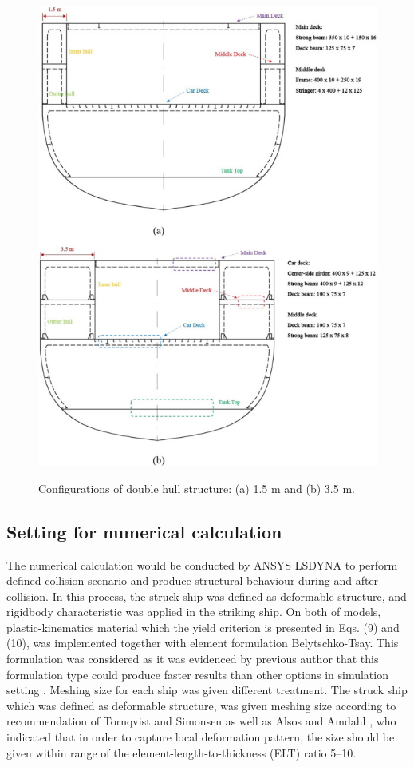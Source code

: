 \documentclass[../Final.tex]{subfiles}
\begin{document}
\begin{figure}[h]
    \centering
    \includegraphics[width=\columnwidth]{fig2.jpg}
    \label{fig2}
    \caption{Configurations of double hull structure: (a) 1.5 m and (b) 3.5 m.}
\end{figure}

\subsection{Setting for numerical calculation}

The numerical calculation would be conducted by ANSYS LS­DYNA \cite{ansys2017user} to perform defined collision scenario and produce structural behaviour during and after collision. 
In this process, the struck ship was defined as deformable structure, and rigid­body characteristic was applied in the striking ship. 
On both of models, plastic-kinematics material which the yield criterion is presented in Eqs. (9) and (10), was implemented together with element formulation Belytschko-Tsay. 
This formulation was considered as it was evidenced by previous author that this formulation type could produce faster results than other options in simulation setting \cite{bae2016study}. 
Meshing size for each ship was given different treatment. The struck ship which was defined as deformable structure, was given meshing size according to rec­ommendation of Tornqvist and Simonsen \cite{toernqvist2004safety}
as well as Alsos and Amdahl \cite{alsos2007resistance}, who indicated that in order to capture local deformation pattern, the size should be given within range of the element-length-to-thickness (ELT) ratio 5–10.
\end{document}
